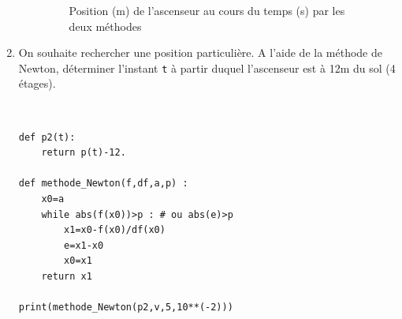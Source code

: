 \documentclass[a4paper,12pt]{article}
\begin{document}
\begin{enumerate}
\begin{enumerate}
\begin{solution}
\begin{figure}[!ht]
\begin{center}
 \caption{Position (m) de l'ascenseur au cours du temps (s) par les deux méthodes}
  \label{fig3}
 \end{center}
\end{figure}
\end{solution}
\end{enumerate}
\item On souhaite rechercher une position particulière. A l'aide de la méthode de Newton, déterminer l'instant \verb?t? à partir duquel l'ascenseur est à 12m du sol (4 étages).
\begin{solution}~\ \\
\begin{verbatim}
def p2(t):
    return p(t)-12.

def methode_Newton(f,df,a,p) :
    x0=a
    while abs(f(x0))>p : # ou abs(e)>p
        x1=x0-f(x0)/df(x0)
        e=x1-x0
        x0=x1
    return x1

print(methode_Newton(p2,v,5,10**(-2)))
\end{verbatim}
\end{solution}        
\end{enumerate}
\end{document}

